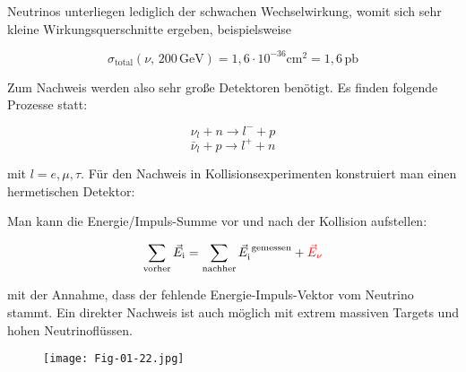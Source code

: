 Neutrinos unterliegen lediglich der schwachen Wechselwirkung, womit sich sehr kleine
Wirkungsquerschnitte ergeben, beispielsweise

\[\sigma_\text{total}(\nu,\,200\,\text{GeV}) = 1{,}6\cdot10^{-36}\text{cm}^2 = 1{,}6\,\text{pb} \]

Zum Nachweis werden also sehr große Detektoren benötigt. Es finden folgende Prozesse statt:

\[ \nu_l + n \longrightarrow l^- + p \]
\[ \bar{\nu}_l + p \longrightarrow l^+ + n \]

mit $l=e,\mu,\tau$. Für den Nachweis in Kollisionsexperimenten konstruiert man einen hermetischen
Detektor: 

\begin{figure}[H]
		\centering
		
\end{figure}


Man kann die Energie/Impuls-Summe vor und nach der Kollision aufstellen:

\[\sum_\text{vorher} \vec{E}_\text{i} = \sum_\text{nachher} \vec{E}_\text{i}^\text{ gemessen}
+\textcolor{red}{\vec{E}_\nu}\]

mit der Annahme, dass der fehlende Energie-Impuls-Vektor vom Neutrino stammt. Ein direkter Nachweis
ist auch möglich mit extrem massiven Targets und hohen Neutrinoflüssen.

\begin{figure}[H]
	\centering
	\texttt{[image: Fig-01-22.jpg]}
\end{figure}